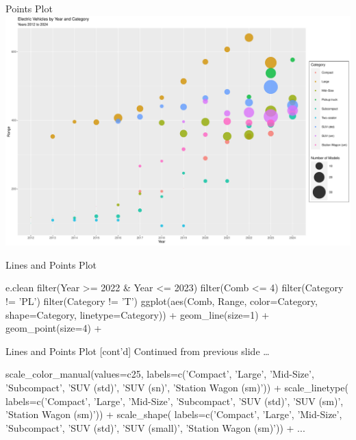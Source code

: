 \documentclass[ignorenonframetext,xcolor=x11names]{beamer}
\begin{document}
\begin{frame}{Points Plot}
  \includegraphics[width=\textwidth]{fuel.pointsSize.pdf}
\end{frame}

\begin{frame}[fragile]{Lines and Points Plot}
\footnotesize
\begin{Rcode}
e.clean %
  filter(Year >= 2022 & Year <= 2023) %
  filter(Comb <= 4) %
  filter(Category != 'PL') %
  filter(Category != 'T') %
ggplot(aes(Comb, Range, 
           color=Category, 
           shape=Category, 
           linetype=Category)) +
  geom_line(size=1) + 
  geom_point(size=4) + 
\end{Rcode}
\end{frame}

\begin{frame}[fragile]{Lines and Points Plot \small [cont'd]}
Continued from previous slide \ldots
\footnotesize
\begin{Rcode}          
  scale_color_manual(values=c25, 
    labels=c('Compact', 'Large', 'Mid-Size', 
             'Subcompact', 'SUV (std)', 
             'SUV (sn)', 'Station Wagon (sm)')) + 
  scale_linetype(
    labels=c('Compact', 'Large', 'Mid-Size', 
             'Subcompact', 'SUV (std)', 
             'SUV (sm)', 'Station Wagon (sm)')) + 
  scale_shape(
    labels=c('Compact', 'Large', 'Mid-Size', 
             'Subcompact', 'SUV (std)', 
             'SUV (small)', 'Station Wagon (sm)')) + 
...
\end{Rcode}
\end{frame}
\end{document}
